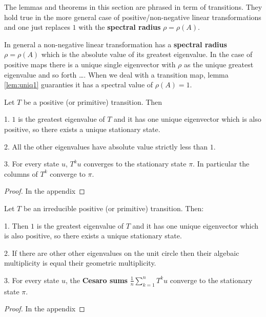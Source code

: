 \begin{remark}
\label{remark:rhoisone}
The lemmas and theorems in this section are phrased in term of transitions. They
hold true in the more general case of positive/non-negative
linear transformations and one just replaces $1$ with the \textbf{spectral
radius} $ \rho = \rho(A)$.

In general a non-negative linear transformation has a \textbf{spectral radius}
$\rho = \rho(A)$ which is the absolute value of its greatest eigenvalue. In the case of
positive maps there is a unique single eigenvector with $\rho$ as the unique
greatest eigenvalue and so forth \dots. When we deal with a transition map,
lemma \ref{lem:uniq1} guaranties 
it has a spectral value of $\rho(A) = 1$.
\end{remark}

\begin{thm}
\label{thm:transition_ev}
Let $T$ be a positive (or primitive) transition. Then 

1. $1$ is the greatest eigenvalue
of $T$ and it has one unique eigenvector which is also positive,
so there exists a unique stationary state.

2. All the other eigenvalues have absolute value strictly less than $1$.

3. For every state $u$, $T^ku$ converges to the stationary state $\pi$.
In particular the columns of $T^k$ converge to $\pi$.

\begin{proof}
In the appendix
\end{proof}
\end{thm}

\begin{thm}
\label{thm:transition_irr_ev}
Let $T$ be an irreducible positive (or primitive) transition. 
Then:

1. Then $1$ is the greatest eigenvalue
of $T$ and it has one unique eigenvector which is also positive,
so there exists a unique stationary state.

2. If there are other other eigenvalues on the unit circle then their algebaic
multiplicity is equal their geometric multiplicity.

3. For every state $u$, the \textbf{Cesaro sums} 
$\frac{1}{n}\sum_{k=1}^n T^ku$ converge to the stationary state $\pi$.

\begin{proof}
In the appendix
\end{proof}
\end{thm}

